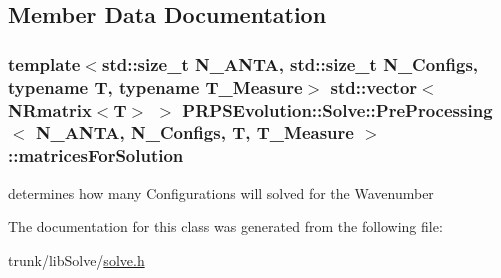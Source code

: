 \subsection{Member Data Documentation}
\hypertarget{class_p_r_p_s_evolution_1_1_solve_1_1_pre_processing_a4e9469f9c8f85349c269b90ff6d435be}{
\subsubsection[{matrices\-For\-Solution}]{\setlength{\rightskip}{0pt plus 5cm}template$<$std\-::size\-\_\-t N\-\_\-\-A\-N\-T\-A, std\-::size\-\_\-t N\-\_\-\-Configs, typename T, typename T\-\_\-\-Measure$>$ std\-::vector$<$N\-Rmatrix$<$T$>$ $>$ {\bf P\-R\-P\-S\-Evolution\-::\-Solve\-::\-Pre\-Processing}$<$ N\-\_\-\-A\-N\-T\-A, N\-\_\-\-Configs, T, T\-\_\-\-Measure $>$\-::matrices\-For\-Solution}}\label{class_p_r_p_s_evolution_1_1_solve_1_1_pre_processing_a4e9469f9c8f85349c269b90ff6d435be}
determines how many Configurations will solved for the Wavenumber 

The documentation for this class was generated from the following file\-:\begin{DoxyCompactItemize}
\item 
trunk/lib\-Solve/\hyperlink{solve_8h}{solve.\-h}\end{DoxyCompactItemize}
